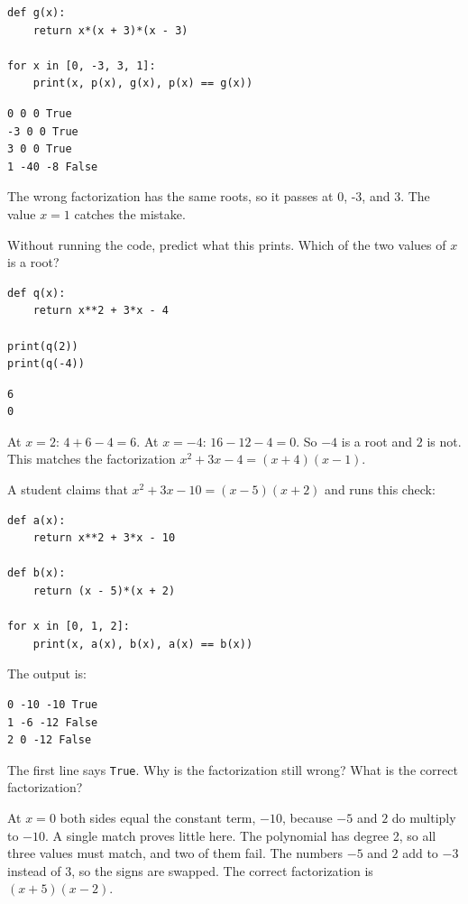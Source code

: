 \begin{verbatim}
def g(x):
    return x*(x + 3)*(x - 3)

for x in [0, -3, 3, 1]:
    print(x, p(x), g(x), p(x) == g(x))
\end{verbatim}

\begin{verbatim}
0 0 0 True
-3 0 0 True
3 0 0 True
1 -40 -8 False
\end{verbatim}

The wrong factorization has the same roots, so it passes at 0, -3, and
3. The value $x = 1$ catches the mistake.

\begin{Exercise}[title={Predict the output}, label={ex:factoring_polynomials-python-1}]
Without running the code, predict what this prints. Which of the two
values of $x$ is a root?
\begin{verbatim}
def q(x):
    return x**2 + 3*x - 4

print(q(2))
print(q(-4))
\end{verbatim}
\end{Exercise}
\begin{Answer}[ref={ex:factoring_polynomials-python-1}]
\begin{verbatim}
6
0
\end{verbatim}
At $x = 2$: $4 + 6 - 4 = 6$. At $x = -4$: $16 - 12 - 4 = 0$. So $-4$ is
a root and $2$ is not. This matches the factorization
$x^2 + 3x - 4 = (x + 4)(x - 1)$.
\end{Answer}

\begin{Exercise}[title={Spot the sign error}, label={ex:factoring_polynomials-python-2}]
A student claims that $x^2 + 3x - 10 = (x - 5)(x + 2)$ and runs this
check:
\begin{verbatim}
def a(x):
    return x**2 + 3*x - 10

def b(x):
    return (x - 5)*(x + 2)

for x in [0, 1, 2]:
    print(x, a(x), b(x), a(x) == b(x))
\end{verbatim}
The output is:
\begin{verbatim}
0 -10 -10 True
1 -6 -12 False
2 0 -12 False
\end{verbatim}
The first line says \texttt{True}. Why is the factorization
still wrong? What is the correct factorization?
\end{Exercise}
\begin{Answer}[ref={ex:factoring_polynomials-python-2}]
At $x = 0$ both sides equal the constant term, $-10$, because $-5$ and
$2$ do multiply to $-10$. A single match proves little here. The polynomial has
degree 2, so all three values must match, and two of them fail. The
numbers $-5$ and $2$ add to $-3$ instead of $3$, so the signs are
swapped. The correct factorization is $(x + 5)(x - 2)$.
\end{Answer}

